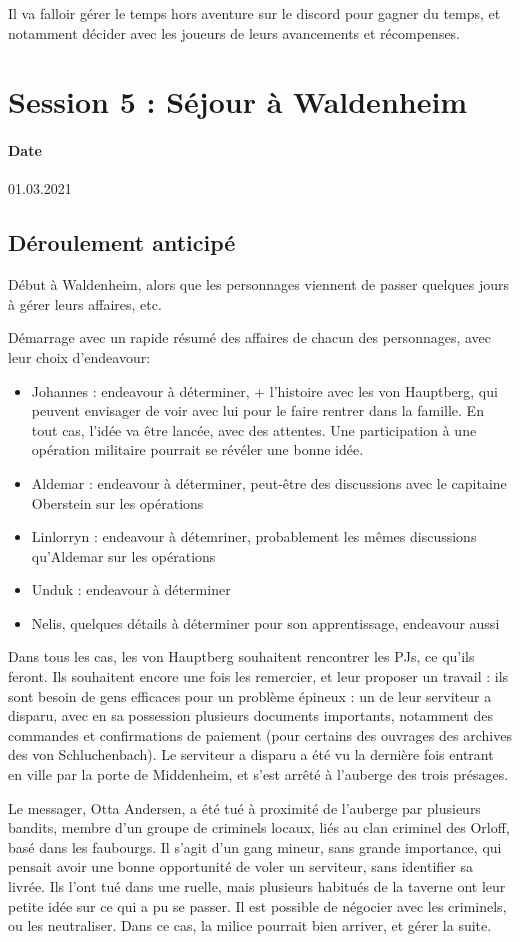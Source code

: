 \documentclass[10pt,a4paper]{book}
\begin{document}
Il va falloir gérer le temps hors aventure sur le discord pour gagner du temps, et notamment décider avec les joueurs de leurs avancements et récompenses.
\section{Session 5 : Séjour à Waldenheim}
\paragraph{Date}01.03.2021
\subsection{Déroulement anticipé}
Début à Waldenheim, alors que les personnages viennent de passer quelques jours à gérer leurs affaires, etc.

Démarrage avec un rapide résumé des affaires de chacun des personnages, avec leur choix d'endeavour:
\begin{itemize}
\item Johannes : endeavour à déterminer, + l'histoire avec les von Hauptberg, qui peuvent envisager de voir avec lui pour le faire rentrer dans la famille. En tout cas, l'idée va être lancée, avec des attentes. Une participation à une opération militaire pourrait se révéler une bonne idée.
\item Aldemar : endeavour à déterminer, peut-être des discussions avec le capitaine Oberstein sur les opérations
\item Linlorryn : endeavour à détemriner, probablement les mêmes discussions qu'Aldemar sur les opérations
\item Unduk : endeavour à déterminer
\item Nelis, quelques détails à déterminer pour son apprentissage, endeavour aussi
\end{itemize}
Dans tous les cas, les von Hauptberg souhaitent rencontrer les PJs, ce qu'ils feront. Ils souhaitent encore une fois les remercier, et leur proposer un travail : ils sont besoin de gens efficaces pour un problème épineux : un de leur serviteur a disparu, avec en sa possession plusieurs documents importants, notamment des commandes et confirmations de paiement (pour certains des ouvrages des archives des von Schluchenbach). Le serviteur a disparu a été vu la dernière fois entrant en ville par la porte de Middenheim, et s'est arrêté à l'auberge des trois présages.

Le messager, Otta Andersen, a été tué à proximité de l'auberge par plusieurs bandits, membre d'un groupe de criminels locaux, liés au clan criminel des Orloff, basé dans les faubourgs. Il s'agit d'un gang mineur, sans grande importance, qui pensait avoir une bonne opportunité de voler un serviteur, sans identifier sa livrée. Ils l'ont tué dans une ruelle, mais plusieurs habitués de la taverne ont leur petite idée sur ce qui a pu se passer. Il est possible de négocier avec les criminels, ou les neutraliser. Dans ce cas, la milice pourrait bien arriver, et gérer la suite.
\end{document}
